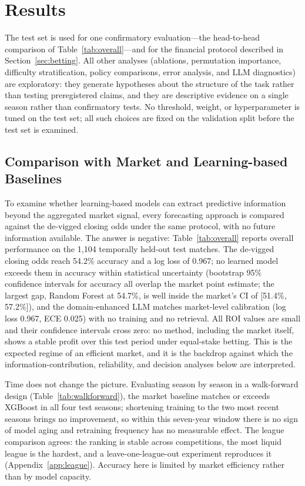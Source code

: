 \documentclass[10pt]{article}
\begin{document}
\section{Results}
\label{sec:results}
The test set is used for one confirmatory evaluation---the head-to-head
comparison of Table~\ref{tab:overall}---and for the financial protocol
described in Section~\ref{sec:betting}. All other analyses (ablations,
permutation importance, difficulty stratification, policy comparisons, error
analysis, and LLM diagnostics) are exploratory: they generate hypotheses about
the structure of the task rather than testing preregistered claims, and they are
descriptive evidence on a single season rather than confirmatory tests. No threshold, weight, or hyperparameter is tuned on the
test set; all such choices are fixed on the validation split before the test
set is examined.

\subsection{Comparison with Market and Learning-based Baselines}
\label{sec:rq1}
To examine whether learning-based models can extract predictive information
beyond the aggregated market signal, every forecasting approach is compared
against the de-vigged closing odds under the same protocol, with no future
information available. The answer is negative: Table~\ref{tab:overall} reports overall
performance on the 1{,}104
temporally held-out test matches. The de-vigged closing odds reach 54.2\%
accuracy and a log loss of 0.967; no learned model exceeds them in accuracy
within statistical uncertainty (bootstrap 95\% confidence intervals for
accuracy all overlap the market point estimate; the largest gap, Random Forest
at 54.7\%, is well inside the market's CI of [51.4\%, 57.2\%]), and the
domain-enhanced LLM matches market-level calibration (log loss 0.967, ECE
0.025) with no training and no retrieval. All ROI values are small and their
confidence intervals cross zero: no method, including the market itself, shows
a stable profit over this test period under equal-stake betting. This is the
expected regime of an efficient market, and it is the backdrop against which
the information-contribution, reliability, and decision analyses below are
interpreted.

Time does not change the picture. Evaluating season by season in a walk-forward
design (Table~\ref{tab:walkforward}), the market baseline matches or exceeds
XGBoost in all four test seasons; shortening training to the two most recent
seasons brings no improvement, so within this seven-year window there is no sign
of model aging and retraining frequency has no measurable effect. The league
comparison agrees: the ranking is stable across competitions, the most liquid
league is the hardest, and a leave-one-league-out experiment reproduces it
(Appendix~\ref{app:league}). Accuracy here is limited by market efficiency rather
than by model capacity.
\end{document}
